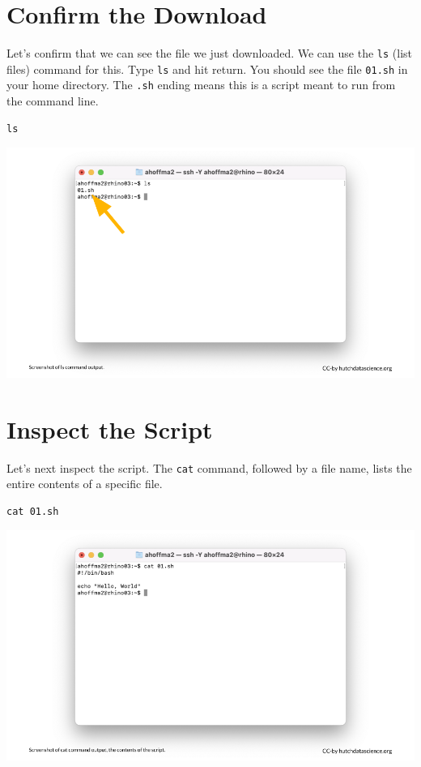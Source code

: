 \documentclass[
]{book}
\begin{document}
\hypertarget{confirm-the-download}{%
\section{Confirm the Download}\label{confirm-the-download}}

Let's confirm that we can see the file we just downloaded. We can use the \texttt{ls} (list files) command for this. Type \texttt{ls} and hit return. You should see the file \texttt{01.sh} in your home directory. The \texttt{.sh} ending means this is a script meant to run from the command line.

\begin{verbatim}
ls
\end{verbatim}

\includegraphics[width=1\linewidth]{resources/images/06-first-job_files/figure-latex//1BQxrVYdKZTbpCaF-i_q9w7s9x034lEXpQZDU-Sl09cs_g1579ffd7b01_0_6}

\hypertarget{inspect-the-script}{%
\section{Inspect the Script}\label{inspect-the-script}}

Let's next inspect the script. The \texttt{cat} command, followed by a file name, lists the entire contents of a specific file.

\begin{verbatim}
cat 01.sh
\end{verbatim}

\includegraphics[width=1\linewidth]{resources/images/06-first-job_files/figure-latex//1BQxrVYdKZTbpCaF-i_q9w7s9x034lEXpQZDU-Sl09cs_g1579ffd7b01_12_2}
\end{document}
